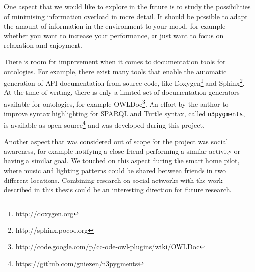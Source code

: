 One aspect that we would like to explore in the future is to study the possibilities of minimising information overload in more detail. It should be possible to adapt the amount of information in the environment to your mood, for example whether you want to increase your performance, or just want to focus on relaxation and enjoyment.


There is room for improvement when it comes to documentation tools for ontologies. For example, there exist many tools that enable the automatic generation of \ac{API} documentation from source code, like Doxygen\footnote{http://doxygen.org} and Sphinx\footnote{http://sphinx.pocoo.org}. At the time of writing, there is only a limited set of documentation generators available for ontologies, for example OWLDoc\footnote{http://code.google.com/p/co-ode-owl-plugins/wiki/OWLDoc}. An effort by the author to improve syntax highlighting for \ac{SPARQL} and Turtle syntax, called \texttt{n3pygments}, is available as open source\footnote{https://github.com/gniezen/n3pygments} and was developed during this project.


Another aspect that was considered out of scope for the project was social awareness, for example notifying a close friend performing a similar activity or having a similar goal. We touched on this aspect during the smart home pilot, where music and lighting patterns could be shared between friends in two different locations. Combining research on social networks with the work described in this thesis could be an interesting direction for future research.


